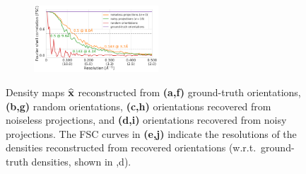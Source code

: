 \begin{figure}[t]
\begin{subfigure}[b]{0.30\linewidth}
        \centering
        \includegraphics[height=2.5cm]{figures/5a1a_quartercvg_uniformS2_noise0_FSC_apr_init_customFSC2.pdf}
        \caption{}
    \end{subfigure}
    \caption{%
        Density maps $\widehat{\mathbf{x}}$ reconstructed from \textbf{(a,f)} ground-truth orientations, \textbf{(b,g)} random orientations, \textbf{(c,h)} orientations recovered from noiseless projections, and \textbf{(d,i)} orientations recovered from noisy projections.
        The FSC curves in \textbf{(e,j)} indicate the resolutions of the densities reconstructed from recovered orientations (w.r.t.\ ground-truth densities, shown in ,d).
    }\label{fig:reconstructions}
\end{figure}



